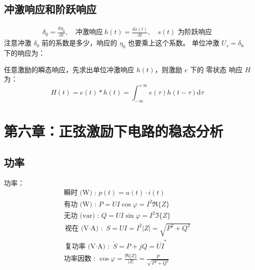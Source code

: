 \documentclass[a4paper]{article}  %
\theoremstyle{MyLineTheoremStyle} %
\theoremstyle{MyBlockTheoremStyle} %
\theoremstyle{MySubsubsectionStyle} %
\begin{document}
\begin{multicols*}{4}
\subsection{冲激响应和阶跃响应}
\begin{gather}
    \delta_0 = \frac{\mathrm{d} \eta_0 }{\mathrm{d} t } ,\quad 
    \text{冲激响应}\  h(t) = \frac{\mathrm{d} s(t)}{\mathrm{d} t},\quad s(t) \text{\ 为阶跃响应}
\end{gather}
注意冲激 $\delta_0$ 前的系数是多少，响应的 $\eta_0$ 也要乘上这个系数。{\color{red} 单位冲激 $U_s = \delta_0$ 下的响应}为：
\begin{table}[H]\centering
{}
\end{table}
任意激励的瞬态响应，先求出单位冲激响应 $h(t)$，则激励 $e$ 下的 {\color{red} 零状态} 响应 $H$ 为：
\begin{equation}
H(t) = e(t) * h(t) = \int_{-\infty}^{+\infty} e(\tau)h(t - \tau) \mathrm{d} \tau
\end{equation}


\section{第六章：正弦激励下电路的稳态分析}

\subsection{功率}

功率：
\begin{gather}
\text{瞬时 (W) : \ } p(t) = u(t) \cdot i(t) \\
\text{有功 (W) : \ } P = UI \cos \varphi = I^2 \Re \{Z\} \\ 
\text{无功 (var) : \ } Q = UI \sin \varphi = I^2 \Im \{Z\} \\
\text{视在 (V$\cdot$A) : \ } S = UI = I^2 |Z| = \sqrt{P^2 + Q^2} \\ 
\text{复功率 (V$\cdot$A) : \ } \dot{S} = P + jQ = \dot{U}\dot{I}^*\\
\text{功率因数 : \ } \cos \varphi = \frac{\Re \{Z\}}{|Z|} = \frac{P}{\sqrt{P^2 + Q^2}} 
\end{gather}


\end{multicols*}
\end{document}
